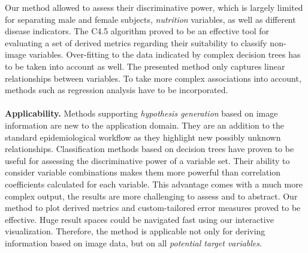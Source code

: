 \documentclass[a4paper,twoside]{style/article}
\begin{document}
Our method allowed to assess their discriminative power, which is largely limited for separating male and female subjects, \emph{nutrition} variables, as well as different disease indicators.
The C4.5 algorithm proved to be an effective tool for evaluating a set of derived metrics regarding their suitability to classify non-image variables.
Over-fitting to the data indicated by complex decision trees has to be taken into account as well.
The presented method only captures linear relationships between variables.
To take more complex associations into account, methods such as regression analysis have to be incorporated.
\\\\
\noindent \textbf{Applicability.}
Methods supporting \emph{hypothesis generation} based on image information are new to the application domain.
They are an addition to the standard epidemiological workflow as they highlight new possibly unknown relationships.
Classification methods based on decision trees have proven to be useful for assessing the discriminative power of a variable set.
Their ability to consider variable combinations makes them more powerful than correlation coefficients calculated for each variable.
This advantage comes with a much more complex output, the results are more challenging to assess and to abstract.
Our method to plot derived metrics and custom-tailored error measures proved to be effective.
Huge result spaces could be navigated fast using our interactive visualization.
Therefore, the method is applicable not only for deriving information based on image data, but on all \emph{potential target variables}.
\\\\
\end{document}
